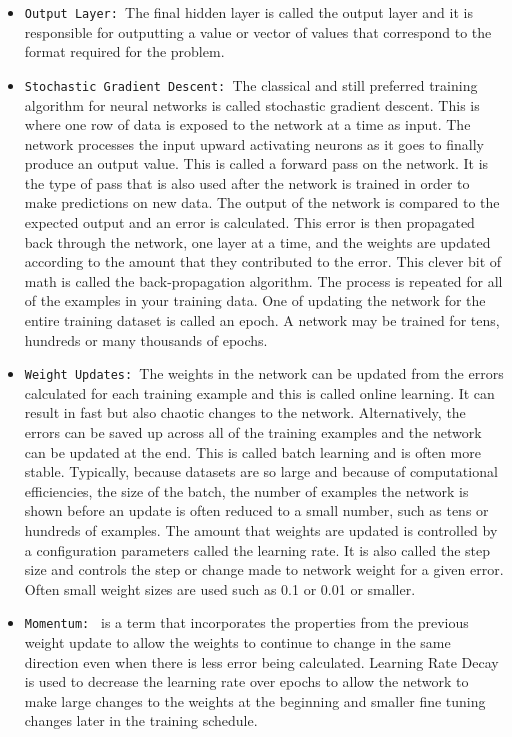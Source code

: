 \documentclass[12pt]{article}
\begin{document}
\begin{itemize}
\item
\texttt{Output Layer: }The final hidden layer is called the output layer and it is responsible for outputting a value or vector of values that correspond to the format required for the problem.

\item
\texttt{Stochastic Gradient Descent: }The classical and still preferred training algorithm for neural networks is called stochastic gradient descent. This is where one row of data is exposed to the network at a time as input. The network processes the input upward activating neurons as it goes to finally produce an output value. This is called a forward pass on the network. It is the type of pass that is also used after the network is trained in order to make predictions on new data. The output of the network is compared to the expected output and an error is calculated. This error is then propagated back through the network, one layer at a time, and the weights are updated according to the amount that they contributed to the error. This clever bit of math is called the back-propagation algorithm. The process is repeated for all of the examples in your training data. One of updating the network for the entire training dataset is called an epoch. A network may be trained for tens, hundreds or many thousands of epochs.

\item
\texttt{Weight Updates: }The weights in the network can be updated from the errors calculated for each training example and this is called online learning. It can result in fast but also chaotic changes to the network. Alternatively, the errors can be saved up across all of the training examples and the network can be updated at the end. This is called batch learning and is often more stable. Typically, because datasets are so large and because of computational efficiencies, the size of the batch, the number of examples the network is shown before an update is often reduced to a small number, such as tens or hundreds of examples. The amount that weights are updated is controlled by a configuration parameters called the learning rate. It is also called the step size and controls the step or change made to network weight for a given error. Often small weight sizes are used such as 0.1 or 0.01 or smaller.

\item
\texttt{Momentum: } is a term that incorporates the properties from the previous weight update to allow the weights to continue to change in the same direction even when there is less error being calculated. Learning Rate Decay is used to decrease the learning rate over epochs to allow the network to make large changes to the weights at the beginning and smaller fine tuning changes later in the training schedule.


\end{itemize}
\end{document}

